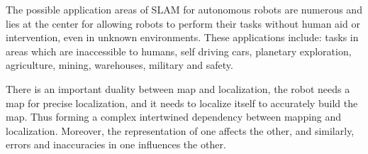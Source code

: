 The possible application areas of SLAM for autonomous robots are numerous and lies at the center for allowing robots to perform their tasks without human aid or intervention, even in unknown environments\:\cite{khole_comprehensive_2023}. These applications include: tasks in areas which are inaccessible to humans, self driving cars, planetary exploration, agriculture, mining, warehouses, military and safety\:\cite{khole_comprehensive_2023}\cite{adzhar_review_2020}\cite{khan_investigation_2022}\cite{liu_path_2023}\cite{fasiolo_comparing_2023}.



There is an important duality between map and localization, the robot needs a map for precise localization, and it needs to localize itself to accurately build the map\:\cite{siegwart_introduction_2011}\cite{schulz_real-time_2020}\cite{corke_robotics_2023}. Thus forming a complex intertwined dependency between mapping and localization\:\cite{khole_comprehensive_2023}. Moreover, the representation of one affects the other, and similarly, errors and inaccuracies in one influences the other\:\cite{siegwart_introduction_2011}. 

\begin{comment}
This leads to an important concept which in this paper will be called spatial correlation of map features. As the robot moves, observes and builds the map, the estimate of the robot position becomes correlated with map features, and map features also become correlated with each other\:\cite{siegwart_introduction_2011}. The robots estimate of its position is naturally dependent on the map it has built for localization and the map features it contains\:\cite{siegwart_introduction_2011}. Similarly, if the exact location of one map feature is known, given a complete map, the exact location of other map features can be established in relation to the first, in an ideal scenario\:\cite{siegwart_introduction_2011}. 
This correlation naturally begins at zero, and as the robot moves, makes more observations and builds the map, the correlation increases, ideally reaching full correlation at the limit, assuming no sensor errors\:\cite{siegwart_introduction_2011}.
\end{comment}

